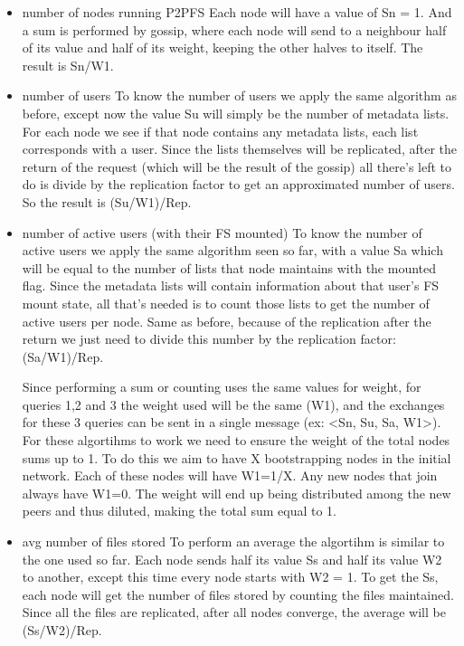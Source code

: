 \documentclass[times,9pt,article]{llncs}
\begin{document}
\begin{itemize}

\item number of nodes running P2PFS
Each node will have a value of Sn = 1. And a sum is performed by gossip, where each 
node will send to a neighbour half of its value and half of its weight, keeping the 
other halves to itself. The result is Sn/W1.

\item number of users
To know the number of users we apply the same algorithm as before, except now 
the value Su will simply be the number of metadata lists. For each node we see if
that node contains any metadata lists, each list corresponds with a user. Since 
the lists themselves will be replicated, after the return of the request (which will
be the result of the gossip) all there's left to do is divide by the replication 
factor to get an approximated number of users. So the result is (Su/W1)/Rep.

\item number of active users (with their FS mounted)
To know the number of active users we apply the same algorithm seen so far, with a
value Sa which will be equal to the number of lists that node maintains with the
mounted flag. Since the metadata lists will contain information about that user's
FS mount state, all that's needed is to count those lists to get the number of
active users per node. Same as before, because of the replication after the return
we just need to divide this number by the replication factor: (Sa/W1)/Rep.

Since performing a sum or counting uses the same values for weight, for queries 1,2 
and 3 the weight used will be the same (W1), and the exchanges for these 3 queries 
can be sent in a single message (ex: <Sn, Su, Sa, W1>). For these algortihms to work 
we need to ensure the weight of the total nodes sums up to 1. To do this we aim to
have X bootstrapping nodes in the initial network. Each of these nodes will have 
W1=1/X. 
Any new nodes that join always have W1=0. The weight will end up being distributed 
among the new peers and thus diluted, making the total sum equal to 1.

\item avg number of files stored
To perform an average the algortihm is similar to the one used so far. Each node
sends half its value Ss and half its value W2 to another, except this time every 
node starts with W2 = 1. To get the Ss, each node will get the number of files 
stored by counting the files maintained. Since all the files are replicated, after
all nodes converge, the average will be (Ss/W2)/Rep.


\end{itemize}
\end{document}
